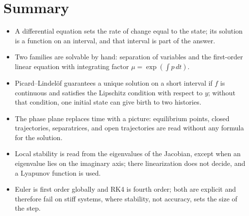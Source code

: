 \section{Summary}
\begin{ringkasan}
\begin{itemize}
\item A differential equation sets the rate of change equal to the state; its solution is a
function on an interval, and that interval is part of the answer.
\item Two families are solvable by hand: separation of variables and the first-order linear
equation with integrating factor $\mu=\exp(\int p\,dt)$.
\item Picard--Lindel\"of guarantees a unique solution on a short interval if $f$ is
continuous and satisfies the Lipschitz condition with respect to $y$; without that condition,
one initial state can give birth to two histories.
\item The phase plane replaces time with a picture: equilibrium points, closed trajectories,
separatrices, and open trajectories are read without any formula for the solution.
\item Local stability is read from the eigenvalues of the Jacobian, except when an eigenvalue
lies on the imaginary axis; there linearization does not decide, and a Lyapunov function is
used.
\item Euler is first order globally and RK4 is fourth order; both are explicit and therefore
fail on stiff systems, where stability, not accuracy, sets the size of the step.
\end{itemize}
\end{ringkasan}

